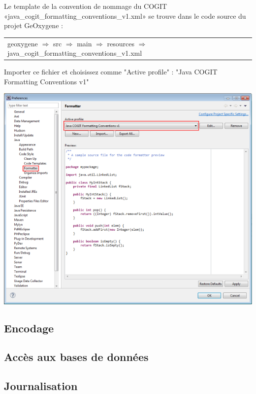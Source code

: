 \noindent
Le template de la convention de nommage du COGIT «java\_cogit\_formatting\_conventions\_v1.xml» se trouve dans le code source du projet GeOxygene :

\begin{tabular}[!t]{llll}
geoxygene $\Rightarrow$  src $\Rightarrow$  main $\Rightarrow$  resources $\Rightarrow$  java\_cogit\_formatting\_conventions\_v1.xml
\end{tabular}

\smallskip

\noindent
Importer ce fichier et choisissez comme "Active profile" : "Java COGIT Formatting Conventions v1" 

\begin{center}
\includegraphics[width=0.5\linewidth]{../../resources/images/guide_installation/ConfigEclipseConventionCodage_2.png}
\end{center}


\subsection{Encodage}


\subsection{ Accès aux bases de données}
\subsection{Journalisation}


